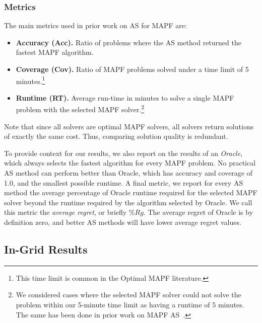 \documentclass{ecai}
\begin{document}
\subsubsection{Metrics}
The main metrics used in prior work on AS for MAPF are:
\begin{itemize}
    \item \textbf{Accuracy (Acc).} Ratio of problems where the AS method returned the fastest MAPF algorithm. 
    \item \textbf{Coverage (Cov).} Ratio of MAPF problems solved under a time limit of 5 minutes.\footnote{This time limit is common in the Optimal MAPF literature.}
    \item \textbf{Runtime (RT).} Average run-time in minutes to solve a single MAPF problem with the selected MAPF solver.\footnote{We considered cases where the selected MAPF solver could not solve the problem within our 5-minute time limit as having a runtime of 5 minutes. The same has been done in prior work on MAPF AS~\cite{kaduri2020algorithm,ren2021mapfast}.}
\end{itemize}
Note that since all solvers are optimal MAPF solvers, all solvers return solutions of exactly the same cost. Thus, comparing solution quality is redundant. 

To provide context for our results, we also report on the results of an \emph{Oracle}, which always selects the fastest algorithm for every MAPF problem. No practical AS method can perform better than Oracle, which has accuracy and coverage of 1.0, and the smallest possible runtime. 
A final metric, we report for every AS method the average percentage of Oracle runtime required for the selected MAPF solver beyond the runtime required by the algorithm selected by Oracle. We call this metric the \emph{average regret}, or briefly $\%Rg$. 
The average regret of Oracle is by definition zero, and better AS methods will have lower average regret values. 



\subsection{In-Grid Results}
\end{document}
